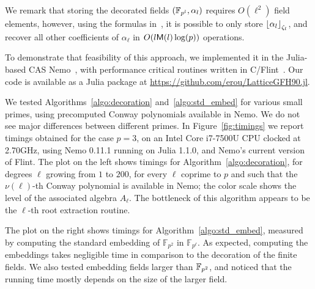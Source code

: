 \documentclass[sigconf]{acmart}
\begin{document}
We remark that storing the decorated fields $(\mathbb{F}_{p^l},\alpha_l)$
requires $O(\ell^2)$ field elements, however, using the formulas
in~\cite{Allombert02,brieulle2018computing}, it is possible to only
store $\left\lfloor \alpha_l \right\rfloor_{\zeta_l}$, and recover all other
coefficients of $\alpha_\ell$ in $O(l\mathsf{M}(l)\log(p))$ operations.

To demonstrate that feasibility of this approach, we implemented it in
the Julia-based CAS Nemo~\cite{Fieker:2017:NCA:3087604.3087611}, with
performance critical routines written in C/Flint~\cite{flint}. %
Our code is available as a Julia package at
\url{https://github.com/erou/LatticeGFH90.jl}.

We tested Algorithms~\ref{algo:decoration} and~\ref{algo:std_embed}
for various small primes, using precomputed Conway polynomials
available in Nemo. %
We do not see major differences between different primes. %
In Figure~\ref{fig:timings} we report timings obtained for the case
$p=3$, on an Intel Core i7-7500U CPU clocked at 2.70GHz, using Nemo
0.11.1 running on Julia 1.1.0, and Nemo's current version of Flint. %
The plot on the left shows timings for
Algorithm~\ref{algo:decoration}, for degrees $\ell$ growing from $1$
to $200$, for every $\ell$ coprime to $p$ and such that the
$\nu(\ell)$-th Conway polynomial is available in Nemo; the color scale
shows the level of the associated algebra $A_\ell$. %
The bottleneck of this algorithm appears to be the $\ell$-th root
extraction routine.

The plot on the right shows timings for
Algorithm~\ref{algo:std_embed}, measured by computing the standard
embedding of $\mathbb{F}_{p^2}$ in $\mathbb{F}_{p^\ell}$. %
As expected, computing the embeddings takes negligible time in
comparison to the decoration of the finite fields. %
We also tested embedding fields larger than $\mathbb{F}_{p^2}$, and noticed
that the running time mostly depends on the size of the larger field.
\end{document}
